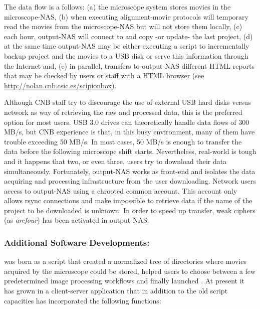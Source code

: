 The data flow is a follows: (a) the microscope system stores movies in the microscope-NAS, (b) when executing alignment-movie protocols \scipionbox will temporary read the movies from 
the microscope-NAS but will not store them locally, (c) each hour, output-NAS will connect to \scipionbox and copy -or update- the last \scipion project, (d) at the same time output-NAS may be either executing a script to incrementally backup \scipion project and the movies to a USB disk or serve this information through the Internet and, (e) in parallel, \scipionbox transfers to  output-NAS different HTML reports that may be checked by users or staff with a HTML browser (see \url{http://nolan.cnb.csic.es/scipionbox}).

Although CNB staff try to discourage the use of external USB hard disks versus network as way of retrieving the raw and processed data, this is the preferred option for most users.
USB 3.0 drives can theoretically handle data flows of 300 MB/s, but CNB experience is that, in this busy environment, many of them  have trouble exceeding 50 MB/s. In most cases, 50 MB/s is enough to transfer the data before the following microscope shift starts. Nevertheless, real-world is tough and it happens that two, or even three,  users try to download their data simultaneously. Fortunately, output-NAS works as front-end and isolates the data acquiring and processing infrastructure from the user downloading. Network users access to output-NAS using a chrooted common account. This account only allows rsync connections and make impossible to retrieve data if the name of the project to be downloaded is unknown. In order to speed up transfer, weak ciphers (as \emph{arcfour}) has been activated in output-NAS.

\subsubsection{Additional Software Developments: \emadmin}

\emadmin was born as a script that created a normalized tree of directories  
where movies acquired by the microscope could be stored, helped users to choose between a few predetermined image processing workflows and finally launched \scipion. At present it has grown in a client-server application that in addition to the old script capacities has incorporated the following functions:

